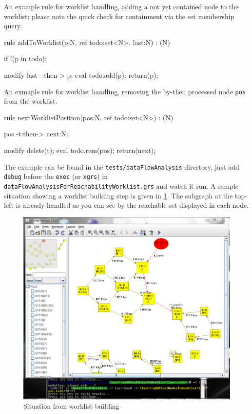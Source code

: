  \begin{example}
An example rule for worklist handling, adding a not yet contained node to the worklist; please note the quick check for containment via the set membership query.
    \begin{grgen}
rule addToWorklist(p:N, ref todo:set<N>, last:N) : (N)
{
  if{ !(p in todo); }

  modify {
    last -:then-> p;
    eval { todo.add(p); }
    return(p);
  }
}
    \end{grgen}
  \end{example}

  \begin{example}
An exmaple rule for worklist handling, removing the by-then processed node \texttt{pos} from the worklist.
    \begin{grgen}
rule nextWorklistPosition(pos:N, ref todo:set<N>) : (N)
{
  pos -t:then-> next:N;

  modify {
    delete(t);
    eval { todo.rem(pos); }
    return(next);
  }
}
    \end{grgen}
  \end{example}

The example can be found in the \texttt{tests/dataFlowAnalysis} directory, just add \texttt{debug} before the \texttt{exec} (or \texttt{xgrs}) in \texttt{dataFlowAnalysisForReachabilityWorklist.grs} and watch it run.
A sample situation showing a worklist building step is given in \ref{figworklist}.
The subgraph at the top-left is already handled as you can see by the reachable set displayed in each node.

\begin{figure}[htbp]
  \centering
  \includegraphics[width=\textwidth]{fig/Worklist}
  \caption{Situation from worklist building}
  \label{figworklist}
\end{figure}

